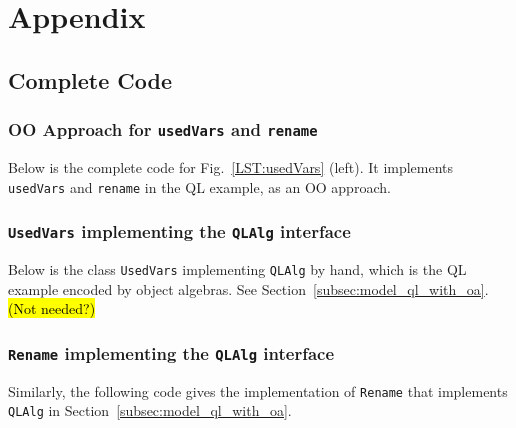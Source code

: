 \clearpage

\section{Appendix}\label{sec:appendix}

\subsection{Complete Code}

\subsubsection{OO Approach for \lstinline{usedVars} and \lstinline{rename}}\label{subsec:appendix_code_oo_approach}

Below is the complete code for Fig.~\ref{LST:usedVars} (left). It implements \lstinline{usedVars} and \lstinline{rename} in the QL example, as an OO approach.


\subsubsection{\lstinline{UsedVars} implementing the \lstinline{QLAlg} interface}\label{subsec:appendix_code_usedvars}

Below is the class \lstinline{UsedVars} implementing \lstinline{QLAlg} by hand, which is the QL example encoded by object algebras. See Section~\ref{subsec:model_ql_with_oa}. \hl{(Not needed?)}


\subsubsection{\lstinline{Rename} implementing the \lstinline{QLAlg} interface}\label{subsec:appendix_code_rename}

Similarly, the following code gives the implementation of \lstinline{Rename} that implements \lstinline{QLAlg} in Section~\ref{subsec:model_ql_with_oa}.


\begin{comment}
\subsubsection{\lstinline{SetMonoid}}\label{subsec:appendix_code_setmonoid}

The implementation of \lstinline{SetMonoid} for Fig.~\ref{ql_with_oaframework} and Section~\ref{subsec:solvingfreevars}.

\end{comment}

